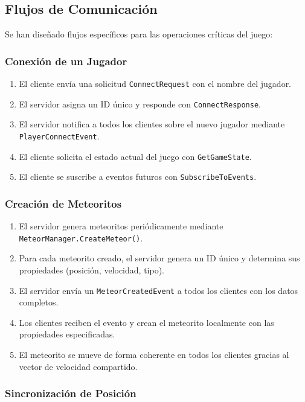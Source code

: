 \documentclass[12pt,letterpaper]{article}
\begin{document}
\subsection{Flujos de Comunicación}

Se han diseñado flujos específicos para las operaciones críticas del juego:

\subsubsection{Conexión de un Jugador}

\begin{enumerate}
    \item El cliente envía una solicitud \texttt{ConnectRequest} con el nombre del jugador.
    \item El servidor asigna un ID único y responde con \texttt{ConnectResponse}.
    \item El servidor notifica a todos los clientes sobre el nuevo jugador mediante \texttt{PlayerConnectEvent}.
    \item El cliente solicita el estado actual del juego con \texttt{GetGameState}.
    \item El cliente se suscribe a eventos futuros con \texttt{SubscribeToEvents}.
\end{enumerate}

\subsubsection{Creación de Meteoritos}

\begin{enumerate}
    \item El servidor genera meteoritos periódicamente mediante \texttt{MeteorManager.CreateMeteor()}.
    \item Para cada meteorito creado, el servidor genera un ID único y determina sus propiedades (posición, velocidad, tipo).
    \item El servidor envía un \texttt{MeteorCreatedEvent} a todos los clientes con los datos completos.
    \item Los clientes reciben el evento y crean el meteorito localmente con las propiedades especificadas.
    \item El meteorito se mueve de forma coherente en todos los clientes gracias al vector de velocidad compartido.
\end{enumerate}

\subsubsection{Sincronización de Posición}
\end{document}
